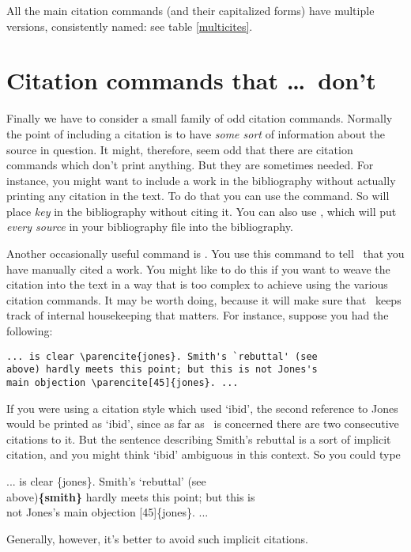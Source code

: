 All the main citation commands (and their capitalized forms) have
multiple versions, consistently named: see table \ref{multicites}.

\section{Citation commands that \ldots\ don't}

Finally we have to consider a small family of odd citation
commands. Normally the point of including a citation is to have
\emph{some sort} of information about the source in question. It
might, therefore, seem odd that there are citation commands which
don't print anything. But they are sometimes needed. For instance, you
might want to include a work in the bibliography without actually
printing any citation in the text. To do that you can use the 
command. So  will place \emph{key} in the
bibliography without citing it. You can also use ,
which will put \emph{every source} in your bibliography file into the
bibliography.

Another occasionally useful command is . You use this
command to tell \biblatex\ that you have manually cited a work. You
might like to do this if you want to weave the citation into the text
in a way that is too complex to achieve using the various citation
commands. It may be worth doing, because it will make sure that
\biblatex\ keeps track of internal housekeeping that matters. For
instance, suppose you had the following:
\begin{verbatim}
... is clear \parencite{jones}. Smith's `rebuttal' (see 
above) hardly meets this point; but this is not Jones's 
main objection \parencite[45]{jones}. ...
\end{verbatim}
If you were using a citation style which used `ibid', the second
reference to Jones would be printed as `ibid', since as far as
\biblatex\ is concerned there are two consecutive citations to it. But
the sentence describing Smith's rebuttal is a sort of implicit
citation, and you might think `ibid' ambiguous in this context. So you
could type
\begin{pseudoverb}
... is clear \{jones\}. Smith's `rebuttal' (see\\
above){\bfseries{}\{smith\}} hardly meets this point; but this is\\
not Jones's main objection [45]\{jones\}. ...
\end{pseudoverb}
Generally, however, it's better to avoid such implicit citations.

